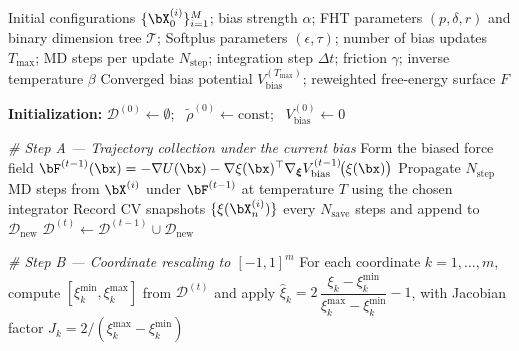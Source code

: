 \documentclass[a4paper,fleqn]{cas-sc}
\theoremstyle{definition}
\begin{document}
\begin{algorithm}[ht]
\caption{Path-dependent McKean-Vlasov adaptive enhanced sampling using FHT density estimation.}
\label{alg:adaptive}
\begin{algorithmic}[1]
\REQUIRE Initial configurations $\{\bX_0^{(i)}\}_{i=1}^M$; bias strength $\alpha$; FHT parameters $(p,\delta,r)$ and binary dimension tree $\mathcal{T}$; Softplus parameters $(\epsilon,\tau)$; number of bias updates $T_{\max}$; MD steps per update $N_{\mathrm{step}}$; integration step $\Delta t$; friction $\gamma$; inverse temperature $\beta$
\ENSURE Converged bias potential $V_{\mathrm{bias}}^{(T_{\max})}$; reweighted free-energy surface $F$
 
\STATE \textbf{Initialization:} $\mathcal{D}^{(0)} \leftarrow \emptyset$; \ $\widetilde{\rho}^{(0)} \leftarrow \text{const}$; \ $V_{\mathrm{bias}}^{(0)} \leftarrow 0$ 
 
 
    \STATE \emph{\# Step A --- Trajectory collection under the current bias}
    \STATE Form the biased force field $\bF^{(t-1)}(\bx) = -\nabla U(\bx) - \nabla\xi(\bx)^\top \nabla_{\boldsymbol{\xi}} V_{\mathrm{bias}}^{(t-1)}\!\bigl(\xi(\bx)\bigr)$  
        \STATE Propagate $N_{\mathrm{step}}$ MD steps from $\bX^{(i)}$ under $\bF^{(t-1)}$ at temperature $T$ using the chosen integrator 
        \STATE Record CV snapshots $\{\xi(\bX_n^{(i)})\}$ every $N_{\mathrm{save}}$ steps and append to $\mathcal{D}_{\mathrm{new}}$
    \ENDFOR
    \STATE $\mathcal{D}^{(t)} \leftarrow \mathcal{D}^{(t-1)} \cup \mathcal{D}_{\mathrm{new}}$
 
    \STATE \emph{\# Step B --- Coordinate rescaling to $[-1,1]^m$}
    \STATE For each coordinate $k=1,\dots,m$, compute $[\xi_k^{\min},\xi_k^{\max}]$ from $\mathcal{D}^{(t)}$ and apply
    \STATE \quad $\widehat{\xi}_k = 2\,\dfrac{\xi_k - \xi_k^{\min}}{\xi_k^{\max}-\xi_k^{\min}} - 1$, \quad with Jacobian factor $J_k = 2/(\xi_k^{\max}-\xi_k^{\min})$
 

\end{algorithmic}
\end{algorithm}
\end{document}
